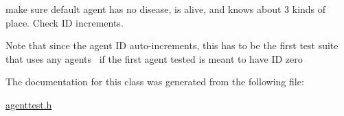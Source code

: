 make sure default agent has no disease, is alive, and knows about 3 kinds of place. Check ID increments. 

Note that since the agent ID auto-\/increments, this has to be the first test suite that uses any agents~\newline
if the first agent tested is meant to have ID zero 

The documentation for this class was generated from the following file\+:\begin{DoxyCompactItemize}
\item 
\mbox{\hyperlink{agenttest_8h}{agenttest.\+h}}\end{DoxyCompactItemize}

